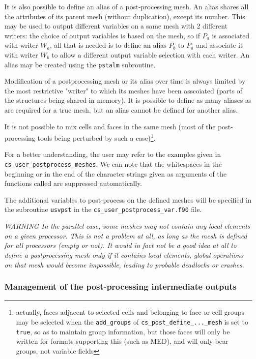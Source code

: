 {{{It is also possible to define an alias of a post-processing mesh. An
alias shares all the attributes of its parent mesh (without duplication),
except its number. This may be used to output different variables on a
same mesh with 2 different writers: the choice of output variables
is based on the mesh, so if $P_a$ is associated with writer $W_a$,
all that is needed is to define an alias $P_b$ to $P_a$ and associate
it with writer $W_b$ to allow a different output variable selection with
each writer. An alias may be created using the \texttt{pstalm} subroutine.

Modification of a postprocessing mesh or its alias over time is always
limited by the most restrictive "writer" to which its meshes have been
asscoiated (parts of the structures being shared in memory). It is
possible to define as many aliases as are required for a true mesh,
but an alias cannot be defined for another alias.

It is not possible to mix cells and faces in the same mesh (most of
the post-processing tools being perturbed by such a case)\footnote{actually,
faces adjacent to selected cells and belonging to face or cell groups
may be selected when the \texttt{add\_groups} of
\texttt{cs\_post\_define\_...\_mesh} is set to \texttt{true},
so as to maintain group information, but those faces will
only be written for formats supporting this (such as MED),
and will only bear groups, not variable fields}.

For a better understanding, the user may refer to the examples given in
\texttt{cs\_user\_postprocess\_meshes}. We can note that the whitespaces
in the beginning or in the end of the character strings given as arguments
of the functions called are suppressed automatically.

The additional variables to post-process on the defined meshes
will be specified in the subroutine \texttt{usvpst} in the 
\texttt{cs\_user\_postprocess\_var.f90} file.

{\em WARNING In the parallel case, some meshes may not contain any
local elements on a given processor. This is not a problem at all, as
long as the mesh is defined for all processors (empty or not).
It would in fact not be a good idea at all to define a postprocessing
mesh only if it contains local elements, global operations on that
mesh would become impossible, leading to probable deadlocks or crashes.}

\subsubsection{Management of the post-processing intermediate outputs}

}}}
